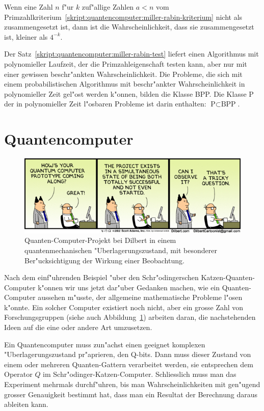 \begin{satz}
\label{skript:quantencomputer:miller-rabin-test}
Wenn eine Zahl $n$ f"ur $k$ zuf"allige Zahlen $a<n$ vom
Primzahlkriterium~\ref{skript:quantencomputer:miller-rabin-kriterium}
nicht als zusammengesetzt ist, dann ist die Wahrscheinlichkeit,
dass sie zusammengesetzt ist, kleiner als $4^{-k}$.
\end{satz}

Der Satz~\ref{skript:quantencomputer:miller-rabin-test} liefert einen Algorithmus
mit polynomieller Laufzeit, der die Primzahleigenschaft testen kann,
aber nur mit einer gewissen beschr"ankten Wahrscheinlichkeit.
Die Probleme, die sich mit einem probabilistischen Algorithmus mit
beschr"ankter Wahrscheinlichkeit in polynomieller Zeit gel"ost
werden k"onnen, bilden die Klasse BPP.
Die Klasse P der in polynomieller Zeit l"osbaren Probleme ist darin
enthalten: $\text{P}\subset\text{BPP}$.

\section{Quantencomputer}
\begin{figure}
\centering
\includegraphics[width=\hsize]{images/dilbert.png}
\caption{Quanten-Computer-Projekt bei Dilbert in einem quantenmechanischen
"Uberlagerungszustand, mit besonderer Ber"ucksichtigung der Wirkung einer
Beobachtung.
\label{skript:dilbert}}
\end{figure}
Nach dem einf"uhrenden Beispiel "uber den Schr"odingerschen
Katzen-Quanten-Computer k"onnen wir uns jetzt dar"uber Gedanken
machen, wie ein Quanten-Computer aussehen m"usste, der allgemeine
mathematische Probleme l"osen k"onnte.
Ein solcher Computer existiert noch nicht, aber ein grosse Zahl von 
Forschungsgruppen (siehe auch Abbildung~\ref{skript:dilbert})
arbeiten daran, die nachstehenden Ideen auf die eine
oder andere Art umzusetzen.

Ein Quantencomputer muss zun"achst einen geeignet komplexen
"Uberlagerungszustand pr"aprieren, den Q-bits. Dann muss dieser Zustand
von einem oder mehreren Quanten-Gattern verarbeitet werden, sie
entsprechen dem Operator $Q$ im Schr"odinger-Katzen-Computer.
Schliesslich muss man das Experiment mehrmals durchf"uhren, bis man
Wahrscheinlichkeiten mit gen"ugend grosser Genauigkeit bestimmt hat,
dass man ein Resultat der Berechnung daraus ableiten kann.

